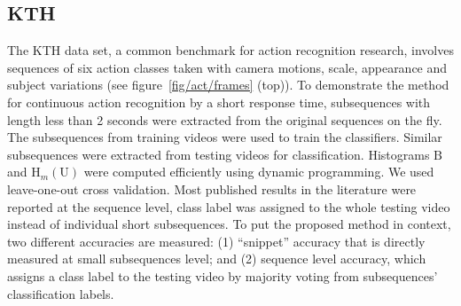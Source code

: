 \subsection{KTH}
The KTH data set, a common benchmark for action recognition research, involves sequences of six action classes taken with camera motions, scale, appearance and subject variations (see figure~\ref{fig/act/frames} (top)). 
To demonstrate the method for continuous action recognition by a short response time, subsequences with length less than 2 seconds were extracted from the original sequences on the fly. The subsequences from training videos were used to train the classifiers. Similar subsequences were extracted from testing videos for classification. Histograms $\mathrm{B}$ and $\mathrm{H}_m(\mathrm{U})$ were computed efficiently using dynamic programming. We used leave-one-out cross validation. Most published results in the literature were reported at the sequence level, class label was assigned to the whole testing video instead of individual short subsequences. To put the proposed method in context, two different accuracies are measured: (1) ``snippet'' accuracy that is directly measured at small subsequences level; and (2) sequence level accuracy, which assigns a class label to the testing video by majority voting from subsequences' classification labels.
